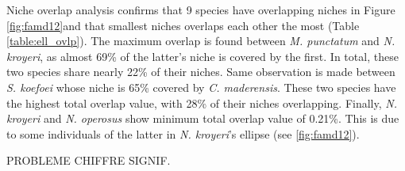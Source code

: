 Niche overlap analysis confirms that 9 species have overlapping niches in Figure \ref{fig:famd12}and that smallest niches overlaps each other the most (Table \ref{table:ell_ovlp}). The maximum  overlap is found between \textit{M. punctatum} and \textit{N. kroyeri}, as almost 69\% of the latter's niche is covered by the first. In total, these two species share nearly 22\% of their niches. Same observation is made between \textit{S. koefoei} whose niche is 65\% covered by \textit{C. maderensis}. These two species have the highest total overlap value, with 28\% of their niches overlapping. Finally, \textit{N. kroyeri} and \textit{N. operosus} show minimum total overlap value of 0.21\%. This is due to some individuals of the latter in \textit{N. kroyeri}'s ellipse (see \ref{fig:famd12}). 

PROBLEME CHIFFRE SIGNIF.

